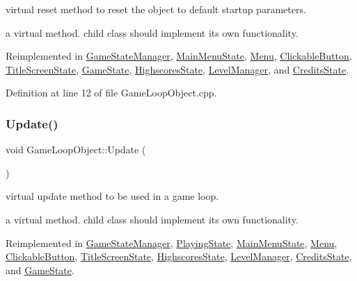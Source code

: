 virtual reset method to reset the object to default startup parameters. 

a virtual method. child class should implement its own functionality. 

Reimplemented in \hyperlink{class_game_state_manager_ab92faa645a6049828d6a4048779e0aee}{Game\+State\+Manager}, \hyperlink{class_main_menu_state_a6f6c9814913db12bc9578411620f9b56}{Main\+Menu\+State}, \hyperlink{class_menu_af48862906748cee615d455eae4ee3349}{Menu}, \hyperlink{class_clickable_button_a01ae3f140debdc8b525e1ef745bdbff3}{Clickable\+Button}, \hyperlink{class_title_screen_state_a7e6cf3ef5534f42a4ca1e75045a45c71}{Title\+Screen\+State}, \hyperlink{class_game_state_a46ac6317883dff0eba4f8f305af6b6bb}{Game\+State}, \hyperlink{class_highscores_state_a6368de23eaf55fa1cd40cba04cbd07a0}{Highscores\+State}, \hyperlink{class_level_manager_a5e1dd3b7ca877857f1246c7fc95b6a3f}{Level\+Manager}, and \hyperlink{class_credits_state_ad87636e8b9438092bd0151185f385c17}{Credits\+State}.



Definition at line 12 of file Game\+Loop\+Object.\+cpp.

\mbox{\label{class_game_loop_object_ae36a15981f1dd3f3bea6050473490349}} 
\subsubsection{\texorpdfstring{Update()}{Update()}}
{\footnotesize\ttfamily void Game\+Loop\+Object\+::\+Update (\begin{DoxyParamCaption}{ }\end{DoxyParamCaption})\hspace{0.3cm}{\ttfamily [virtual]}}



virtual update method to be used in a game loop. 

a virtual method. child class should implement its own functionality. 

Reimplemented in \hyperlink{class_game_state_manager_a749124e1fcaaa5eae4578bf8e3f6e4d5}{Game\+State\+Manager}, \hyperlink{class_playing_state_afb7ccd732dfaad4397b5096876092136}{Playing\+State}, \hyperlink{class_main_menu_state_a35ec35095919057ef7373906b09a9d30}{Main\+Menu\+State}, \hyperlink{class_menu_af29d71473a414e31e914bc637840cb3e}{Menu}, \hyperlink{class_clickable_button_a393e1529583626f6ee52f0955bd68da8}{Clickable\+Button}, \hyperlink{class_title_screen_state_a0db8d35f9d3013155d2e61939d2a47ea}{Title\+Screen\+State}, \hyperlink{class_highscores_state_a8a55079503b5bdaf205e74eb9d48dae0}{Highscores\+State}, \hyperlink{class_level_manager_a7800611361e7c2ae99102e69429456fc}{Level\+Manager}, \hyperlink{class_credits_state_a565adc4ac454f23941c5db684da56ad7}{Credits\+State}, and \hyperlink{class_game_state_a5be51b634f95bc6e57066ad6931aa18b}{Game\+State}.



